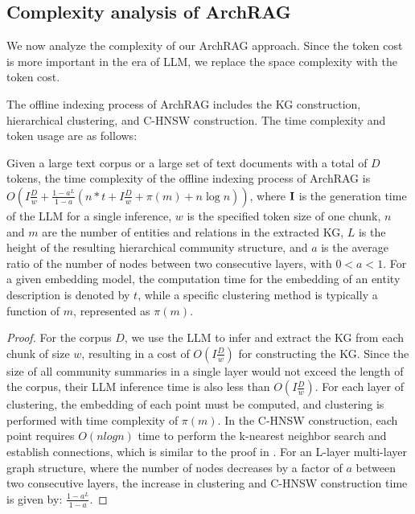 \subsection{Complexity analysis of ArchRAG}
\label{sec:complexity}

We now analyze the complexity of our ArchRAG approach.
% 
Since the token cost is more important in the era of LLM, we replace the space complexity with the token cost.

The offline indexing process of ArchRAG includes the KG construction, hierarchical clustering, and C-HNSW construction.
% 
The time complexity and token usage are as follows:


\begin{lemma}
\label{lemma:index-time}
Given a large text corpus or a large set of text documents with a total of $D$ tokens, the time complexity of the offline indexing process of ArchRAG is $O(I\frac{D}{w} + \frac{1-a^L}{1-a}(n*t+I\frac{D}{w}+\pi(m)+n\log n))$, where ${\bf I}$ is the generation time of the LLM for a single inference, $w$ is the specified token size of one chunk, $n$ and $m$ are the number of entities and relations in the extracted KG, $L$ is the height of the resulting hierarchical community structure, and $a$ is the average ratio of the number of nodes between two consecutive layers, with $0<a<1$. For a given embedding model, the computation time for the embedding of an entity description is denoted by $t$, while a specific clustering method is typically a function of $m$, represented as $\pi(m)$.
\end{lemma}

\begin{proof}
    For the corpus $D$, we use the LLM to infer and extract the KG from each chunk of size $w$, resulting in a cost of $O(I\frac{D}{w})$ for constructing the KG. Since the size of all community summaries in a single layer would not exceed the length of the corpus, their LLM inference time is also less than $O(I\frac{D}{w})$. For each layer of clustering, the embedding of each point must be computed, and clustering is performed with time complexity of $\pi(m)$. In the C-HNSW construction, each point requires $O(nlogn)$ time to perform the k-nearest neighbor search and establish connections, which is similar to the proof in \cite{malkov2018efficient}. For an L-layer multi-layer graph structure, where the number of nodes decreases by a factor of $a$ between two consecutive layers, the increase in clustering and C-HNSW construction time is given by: $\frac{1 - a^L}{1 - a}$.
\end{proof}


